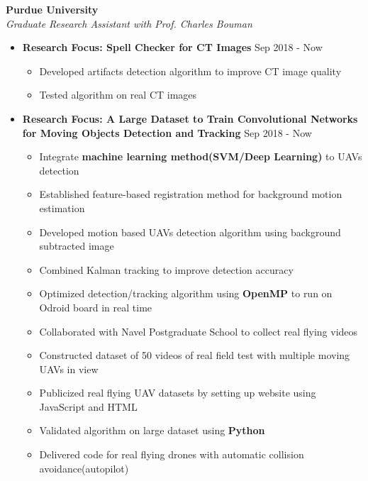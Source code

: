 \documentclass[10pt]{article}
\newenvironment{outerlist}[1][\enskip\textbullet]%
        {\begin{itemize}[#1,leftmargin=*]}{\end{itemize}%
         \vspace{-1.2\baselineskip}}
\newenvironment{innerlist}[1][\enskip\textbullet]%
        {\begin{itemize}[#1,leftmargin=*,parsep=0pt,itemsep=0pt,topsep=0pt,partopsep=0pt]}
        {\end{itemize}}
\begin{document}
\textbf{Purdue University } \\
\emph{Graduate Research Assistant with Prof. Charles Bouman} 
\begin{outerlist}
\vspace{-.1in}
\item[] \textbf{Research Focus: Spell Checker for CT Images} \hfill {Sep 2018 - Now}
\begin{innerlist}
\vspace{-.05in}        
        \item Developed artifacts detection algorithm to improve CT image quality  
        \item Tested algorithm on real CT images  	
        \end{innerlist}
\item[] \textbf{Research Focus: A Large Dataset to Train Convolutional Networks for Moving Objects Detection and Tracking} \hfill {Sep 2018 - Now}
        \begin{innerlist}
\vspace{-.05in}
        \item Integrate \textbf{machine learning method(SVM/Deep Learning)} to UAVs detection
        \item Established feature-based registration method for background motion estimation
        \item Developed motion based UAVs detection algorithm using background subtracted image
        \item Combined Kalman tracking to improve detection accuracy
        \item Optimized detection/tracking algorithm using \textbf{OpenMP} to run on Odroid board in real time
	\item Collaborated with Navel Postgraduate School to collect real flying videos
        \item Constructed dataset of 50 videos of real field test with multiple moving UAVs in view
	\item Publicized real flying UAV datasets by setting up website using JavaScript  and HTML 
        \item Validated algorithm on large dataset using 	\textbf{Python} 
        \item Delivered code for real flying drones with automatic collision avoidance(autopilot)
        \end{innerlist}

\vspace{.2in}
\end{outerlist}
\end{document}
